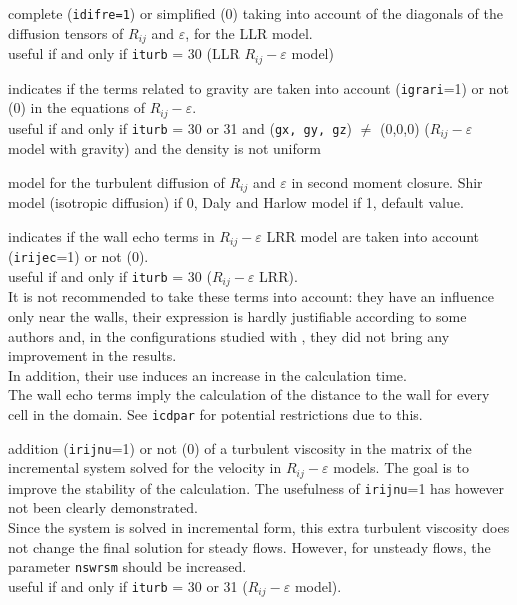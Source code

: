 {complete ({\tt idifre=1}) or simplified (0)
taking into account of the diagonals of the diffusion tensors of $R_{ij}$
and $\varepsilon$, for the LLR model.\\
useful if and only if {\tt iturb} = 30 (LLR $R_{ij}-\varepsilon$ model)}

{indicates if the terms related to gravity are
taken into account ({\tt igrari}=1) or not (0) in the equations of
$R_{ij}-\varepsilon$. \\
useful if and only if {\tt iturb} = 30 or 31 and ({\tt gx, gy, gz}) $\ne$
(0,0,0) ($R_{ij}-\varepsilon$ model with gravity) and the density is not uniform}

{model for the turbulent diffusion of $R_{ij}$ and $\varepsilon$ in second moment closure. Shir model (isotropic diffusion) if 0, Daly and Harlow model if 1, default value.}

{indicates if the wall echo terms in
$R_{ij}-\varepsilon$ LRR model are
taken into account ({\tt irijec}=1) or not (0).\\
useful if and only if {\tt iturb} = 30 ($R_{ij}-\varepsilon$ LRR).\\
It is not recommended to take these terms into account:
they have an influence only near the walls, their expression is hardly
justifiable according to some authors and, in the configurations
studied with \CS, they did not bring any improvement in the results.\\
In addition, their use induces an increase in the calculation
time.\\
The wall echo terms imply the calculation of the distance to the wall
for every cell in the domain. See {\tt icdpar} for potential restrictions
due to this.}

{addition ({\tt irijnu}=1) or not (0) of a
turbulent viscosity in the matrix of the incremental system solved
for the velocity in $R_{ij}-\varepsilon$ models. The goal is to improve
the stability of the calculation. The usefulness of {\tt irijnu}=1 has
however not been clearly demonstrated.\\
Since the system is solved in incremental form, this extra turbulent
viscosity does not change the final solution for steady flows. However,
for unsteady flows, the parameter {\tt nswrsm} should be increased.\\
useful if and only if {\tt iturb} = 30 or 31 ($R_{ij}-\varepsilon$ model).}

